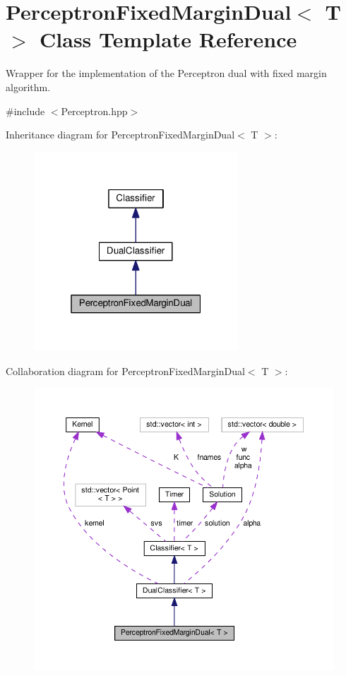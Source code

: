 \hypertarget{class_perceptron_fixed_margin_dual}{}\section{Perceptron\+Fixed\+Margin\+Dual$<$ T $>$ Class Template Reference}
\label{class_perceptron_fixed_margin_dual}


Wrapper for the implementation of the Perceptron dual with fixed margin algorithm.  




{\ttfamily \#include $<$Perceptron.\+hpp$>$}



Inheritance diagram for Perceptron\+Fixed\+Margin\+Dual$<$ T $>$\+:\nopagebreak
\begin{figure}[H]
\begin{center}
\leavevmode
\includegraphics[width=217pt]{class_perceptron_fixed_margin_dual__inherit__graph}
\end{center}
\end{figure}


Collaboration diagram for Perceptron\+Fixed\+Margin\+Dual$<$ T $>$\+:
\nopagebreak
\begin{figure}[H]
\begin{center}
\leavevmode
\includegraphics[width=350pt]{class_perceptron_fixed_margin_dual__coll__graph}
\end{center}
\end{figure}
